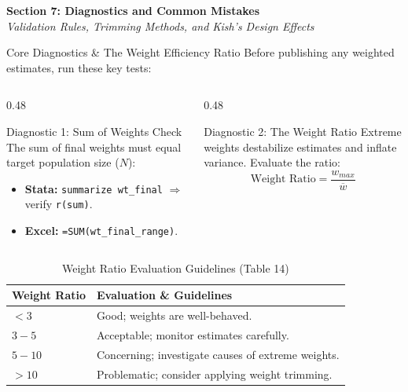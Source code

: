 \documentclass[10pt, aspectratio=169]{beamer}
\begin{document}
{
\begin{frame}[plain, c]
  \centering
  \color{white}
  \Huge \textbf{Section 7: Diagnostics and Common Mistakes} \\
  \vspace{0.4cm}
  \Large \textit{Validation Rules, Trimming Methods, and Kish's Design Effects}
\end{frame}
}

\begin{frame}{Core Diagnostics \& The Weight Efficiency Ratio}
  Before publishing any weighted estimates, run these key tests:
  \begin{columns}[T]
    \begin{column}{0.48\textwidth}
      \begin{block}{Diagnostic 1: Sum of Weights Check}
        The sum of final weights must equal target population size ($N$):
        \begin{itemize}
          \item \textbf{Stata:} \texttt{summarize wt\_final} $\Rightarrow$ verify \texttt{r(sum)}.
          \item \textbf{Excel:} \texttt{=SUM(wt\_final\_range)}.
        \end{itemize}
      \end{block}
    \end{column}
    \begin{column}{0.48\textwidth}
      \begin{block}{Diagnostic 2: The Weight Ratio}
        Extreme weights destabilize estimates and inflate variance. Evaluate the ratio:
        \begin{equation}
          \text{Weight Ratio} = \frac{w_{max}}{\overline{w}}
        \end{equation}
      \end{block}
    \end{column}
  \end{columns}

  \begin{table}
    \centering
    \footnotesize
    \begin{tabular}{ll}
      \toprule
      \textbf{Weight Ratio} & \textbf{Evaluation \& Guidelines} \\
      \midrule
      $< 3$ & Good; weights are well-behaved. \\
      $3 - 5$ & Acceptable; monitor estimates carefully. \\
      $5 - 10$ & Concerning; investigate causes of extreme weights. \\
      $> 10$ & Problematic; consider applying weight trimming. \\
      \bottomrule
    \end{tabular}
    \caption{Weight Ratio Evaluation Guidelines (Table 14)}
  \end{table}
\end{frame}
\end{document}
